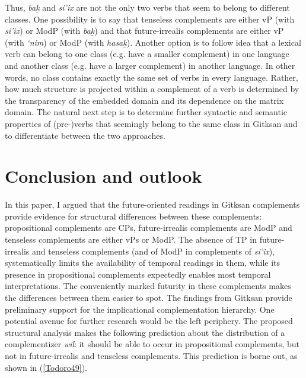 \documentclass[output=paper]{langscibook}
\begin{document}
Thus, \emph{bak̲} and \emph{si’ix} are not the only two verbs that seem to belong to different classes. One possibility is to say that tenseless complements are either vP (with \emph{si’ix}) or ModP (with \emph{bak̲}) and that future-irrealis complements are either vP (with \emph{‘nim}) or ModP (with \emph{hasak̲}). Another option is to follow  idea that a lexical verb can belong to one class (e.g. have a smaller complement) in one language and another class (e.g. have a larger complement) in another language. In other words, no class contains exactly the same  set of verbs in every language. Rather, how much structure is projected within a complement of a verb is determined by the transparency of the embedded domain and its dependence on the matrix domain. The natural next step is to determine further syntactic and semantic properties of (pre-)verbs that seemingly belong to the same class in Gitksan and to differentiate between the two approaches.

\section{Conclusion and outlook}\label{Todoro:sect6}

In this paper, I argued that the future-oriented readings in Gitksan complements provide evidence for structural differences between these complements: propositional complements are CPs, future-irrealis complements are ModP and tenseless complements are either vPs or ModP. The absence of TP in future-irrealis and tenseless complements (and of ModP in complements of \emph{si’ix}), systematically limits the availability of temporal readings in them, while its presence in propositional complements expectedly enables most temporal interpretations. The conveniently marked futurity in these complements makes the differences between them easier to spot. The findings from Gitksan provide preliminary support for the implicational complementation hierarchy. 
One potential avenue for further research would be the left periphery. The proposed structural analysis makes the following prediction about the distribution of a complementizer \emph{wil}: it should be able to occur in propositional complements, but not in future-irrealis and tenseless complements. This prediction is borne out, as shown in (\ref{Todoro49}). 
\end{document}
